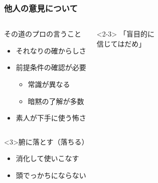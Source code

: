 \documentclass[unicode,12pt]{beamer}%
\begin{document}
\begin{frame}
    \frametitle{他人の意見について}
        \begin{columns}[c, onlytextwidth]
            \large
            \begin{block}{その道のプロの言うこと}
                \begin{itemize}
                    \large
                    \item それなりの確からしさ
                    \item 前提条件の確認が必要
                    \begin{itemize}
                        \large
                        \item 常識が異なる
                        \item 暗黙の了解が多数
                    \end{itemize}
                    \item 素人が下手に使う怖さ
                \end{itemize}
            \end{block}
            <2-3>
            \LARGE
                \alert{「盲目的に\\信じてはだめ」}
        \end{columns}
    \begin{alertblock}<3>{腑に落とす（落ちる）}
        \begin{itemize}
            \item<3> 消化して使いこなす
            \item<3> 頭でっかちにならない
        \end{itemize}
    \end{alertblock}
        
\end{frame}
\end{document}
